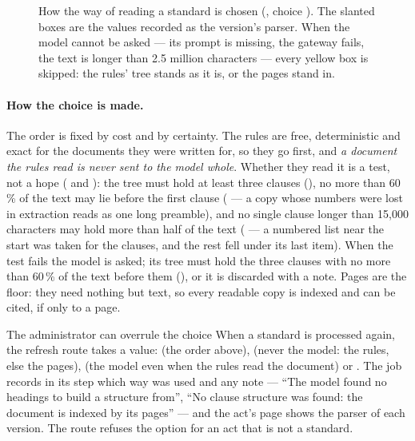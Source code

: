 \begin{figure}[H]
\actorlegend
\caption{How the way of reading a standard is chosen (, choice
). The slanted boxes are the values recorded as the version's parser. When the
model cannot be asked --- its prompt is missing, the gateway fails, the text is longer than
2.5 million characters --- every yellow box is skipped: the rules' tree stands as it is, or
the pages stand in.}\label{fig:corpus:standard}
\end{figure}

\paragraph{How the choice is made.} The order is fixed by cost and by certainty. The rules
are free, deterministic and exact for the documents they were written for, so they go first,
and \emph{a document the rules read is never sent to the model whole}. Whether they read it
is a test, not a hope ( and ): the tree must hold at least
three clauses (), no more than 60\,\% of the text may lie before
the first clause ( --- a copy whose numbers were lost in extraction
reads as one long preamble), and no single clause longer than 15,000 characters may hold more
than half of the text ( --- a numbered list near the start was taken for
the clauses, and the rest fell under its last item). When the test fails the model is asked;
its tree must hold the three clauses with no more than 60\,\% of the text before them
(), or it is discarded with a note. Pages are the floor: they
need nothing but text, so every readable copy is indexed and can be cited, if only to a page.

\begin{humanbox}{The administrator can overrule the choice}
When a standard is processed again, the refresh route takes a  value:
 (the order above),  (never the model: the rules, else the pages),
 (the model even when the rules read the document) or . The job records
in its  step which way was used and any note --- \enquote{The model found no
headings to build a structure from}, \enquote{No clause structure was found: the document is
indexed by its pages} --- and the act's page shows the parser of each version. The route
refuses the option for an act that is not a standard.
\end{humanbox}


